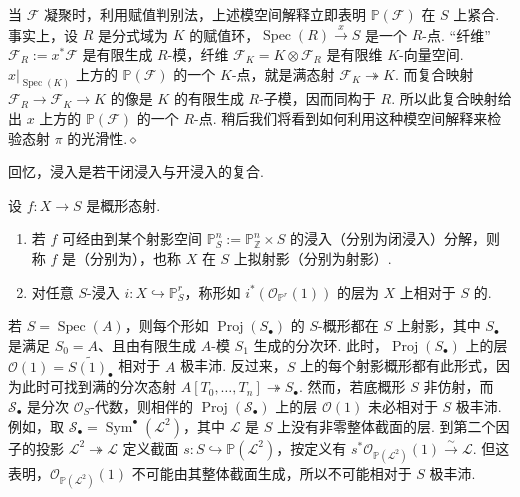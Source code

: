 \begin{remark}\label{item:ag-2-1-6}
当 $\mathcal F$ 凝聚时，利用赋值判别法，上述模空间解释立即表明 $\mathbb P(\mathcal F)$ 在 $S$ 上紧合. 事实上，设 $R$ 是分式域为 $K$ 的赋值环，$\operatorname{Spec}(R)\xrightarrow x S$ 是一个 $R$-点. ``纤维'' $\mathcal F_R:=x^*\mathcal F$ 是有限生成 $R$-模，纤维 $\mathcal F_K=K\otimes \mathcal F_R$ 是有限维 $K$-向量空间. $x|_{\operatorname{Spec}(K)}$ 上方的 $\mathbb P(\mathcal F)$ 的一个 $K$-点，就是满态射 $\mathcal F_K\twoheadrightarrow K$. 而复合映射 $\mathcal F_R\longrightarrow \mathcal F_K\longrightarrow K$ 的像是 $K$ 的有限生成 $R$-子模，因而同构于 $R$. 所以此复合映射给出 $x$ 上方的 $\mathbb P(\mathcal F)$ 的一个 $R$-点.
稍后我们将看到如何利用这种模空间解释来检验态射 $\pi$ 的光滑性.\unskip\nobreak\hfill\ensuremath{\diamond}
\renewcommand{\envenddiamond}{}%
\end{remark}
回忆，浸入是若干闭浸入与开浸入的复合.
\begin{definition}\label{item:ag-2-1-7}
设 $f:X\longrightarrow S$ 是概形态射.
\begin{enumerate}[label=\roman*)]
\item 若 $f$ 可经由到某个射影空间 $\mathbb P_S^n:=\mathbb P_{\mathbb Z}^n\times S$ 的浸入（分别为闭浸入）分解，则称 $f$ 是（分别为），也称 $X$ 在 $S$ 上拟射影（分别为射影）.
\item 对任意 $S$-浸入 $i:X\hookrightarrow\mathbb P_S^r$，称形如 $i^*(\mathcal O_{\mathbb P^r}(1))$ 的层为 $X$ 上相对于 $S$ 的.
\end{enumerate}
\end{definition}
若 $S=\operatorname{Spec}(A)$，则每个形如 $\operatorname{Proj}(S_\bullet)$ 的 $S$-概形都在 $S$ 上射影，其中 $S_\bullet$ 是满足 $S_0=A$、且由有限生成 $A$-模 $S_1$ 生成的分次环. 此时，$\operatorname{Proj}(S_\bullet)$ 上的层 $\mathcal O(1)=\widetilde{S(1)_\bullet}$ 相对于 $A$ 极丰沛. 反过来，$S$ 上的每个射影概形都有此形式，因为此时可找到满的分次态射 $A[T_0,\ldots,T_n]\twoheadrightarrow S_\bullet$.
然而，若底概形 $S$ 非仿射，而 $\mathcal S_\bullet$ 是分次 $\mathcal O_S$-代数，则相伴的 $\operatorname{Proj}(\mathcal S_\bullet)$ 上的层 $\mathcal O(1)$ 未必相对于 $S$ 极丰沛. 例如，取 $\mathcal S_\bullet=\operatorname{Sym}^\bullet(\mathcal L^2)$，其中 $\mathcal L$ 是 $S$ 上没有非零整体截面的层. 到第二个因子的投影 $\mathcal L^2\twoheadrightarrow\mathcal L$ 定义截面 $s:S\hookrightarrow\mathbb P(\mathcal L^2)$，按定义有 $s^*\mathcal O_{\mathbb P(\mathcal L^2)}(1)\xrightarrow\sim\mathcal L$. 但这表明，$\mathcal O_{\mathbb P(\mathcal L^2)}(1)$ 不可能由其整体截面生成，所以不可能相对于 $S$ 极丰沛.
